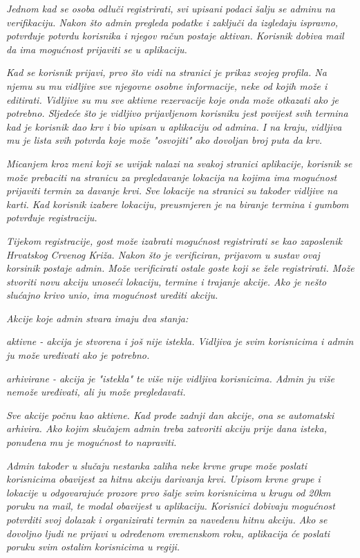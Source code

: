 		\textit{Jednom kad se osoba odluči registrirati, svi upisani podaci šalju se adminu na verifikaciju. Nakon što admin pregleda podatke i zaključi da izgledaju ispravno, potvrđuje potvrdu korisnika i njegov račun postaje aktivan. Korisnik dobiva mail da ima mogućnost prijaviti se u aplikaciju. }

		\textit{Kad se korisnik prijavi, prvo što vidi na stranici je prikaz svojeg profila. Na njemu su mu vidljive sve njegovne osobne informacije, neke od kojih može i editirati. Vidljive su mu sve aktivne rezervacije koje onda može otkazati ako je potrebno. Sljedeće što je vidljivo prijavljenom korisniku jest povijest svih termina kad je korisnik dao krv i bio upisan u aplikaciju od admina. I na kraju, vidljiva mu je lista svih potvrda koje može "osvojiti" ako dovoljan broj puta da krv. }

		\textit{Micanjem kroz meni koji se uvijak nalazi na svakoj stranici aplikacije, korisnik se može prebaciti na stranicu za pregledavanje lokacija na kojima ima mogućnost prijaviti termin za davanje krvi. Sve lokacije na stranici su također vidljive na karti. Kad korisnik izabere lokaciju, preusmjeren je na biranje termina i gumbom potvrđuje registraciju. }

		\textit{Tijekom registracije, gost može izabrati mogućnost registrirati se kao zaposlenik Hrvatskog Crvenog Križa. Nakon što je verificiran, prijavom u sustav ovaj korsinik postaje admin. Može verificirati ostale goste koji se žele registrirati. Može stvoriti novu akciju unoseći lokaciju, termine i trajanje akcije. Ako je nešto slućajno krivo unio, ima mogućnost urediti akciju. }

		\textit{Akcije koje admin stvara imaju dva stanja:}

		\begin{packed_item}
				\item \textit{aktivne - akcija je stvorena i još nije istekla. Vidljiva je svim korisnicima i admin ju može uređivati ako je potrebno.}
				\item \textit{arhivirane - akcija je "istekla" te više nije vidljiva korisnicima. Admin ju više nemože uređivati, ali ju može pregledavati.}
		\end{packed_item}

		\textit{Sve akcije počnu kao aktivne. Kad prođe zadnji dan akcije, ona se automatski arhivira. Ako kojim skučajem admin treba zatvoriti akciju prije dana isteka, ponuđena mu je mogućnost to napraviti.}


		\textit{Admin također u slučaju nestanka zaliha neke krvne grupe može poslati korisnicima obavijest za hitnu akciju darivanja krvi. Upisom krvne grupe i lokacije u odgovarajuće prozore prvo šalje svim korisnicima u krugu od 20km poruku na mail, te modal obavijest u aplikaciju. Korisnici dobivaju mogućnost potvrditi svoj dolazak i organizirati termin za navedenu hitnu akciju. Ako se dovoljno ljudi ne prijavi u određenom vremenskom roku, aplikacija će poslati poruku svim ostalim korisnicima u regiji.}

